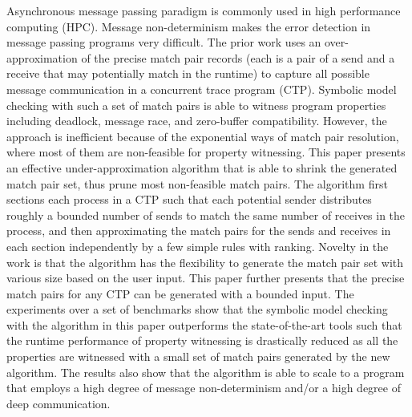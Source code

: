 Asynchronous message passing paradigm is commonly used in high performance computing (HPC).
Message non-determinism makes the error detection in message passing programs very difficult. The prior work uses an over-approximation of the precise match pair records (each is a pair of a send and a receive that may potentially match in the runtime) to capture all possible message communication in a concurrent trace program (CTP). Symbolic model checking with such a set of match pairs is able to witness program properties including deadlock, message race, and zero-buffer compatibility. However, the approach is inefficient because of the exponential ways of match pair resolution, where most of them are non-feasible for property witnessing.
This paper presents an effective under-approximation algorithm that is able to shrink the generated match pair set, thus prune most non-feasible match pairs.
The algorithm first sections each process in a CTP  such that each potential sender distributes roughly a bounded number of sends to match the same number of receives in the process, and then approximating the match pairs for the sends and receives in each section independently by a few simple rules with ranking. 
Novelty in the work is that the algorithm has the flexibility to generate the match pair set with various size based on the user input. This paper further presents that the precise match pairs for any CTP can be generated with a bounded input. The experiments over a set of benchmarks show that the symbolic model checking with the algorithm in this paper outperforms the state-of-the-art tools such that the runtime performance of property witnessing is drastically reduced as all the properties are witnessed with a small set of match pairs generated by the new algorithm. The results also show that the algorithm is able to scale to a program that employs a high degree of message non-determinism and/or a high degree of deep communication.